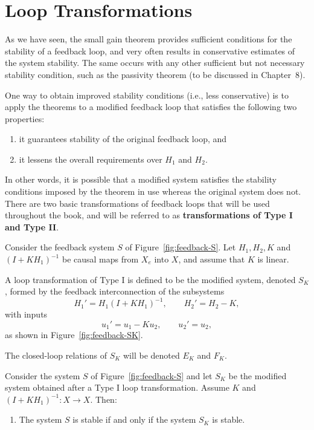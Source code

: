 \section{Loop Transformations}

As we have seen, the small gain theorem provides sufficient conditions for the stability of a feedback loop, and very often results in conservative estimates of the system stability.  
The same occurs with any other sufficient but not necessary stability condition, such as the passivity theorem (to be discussed in Chapter~8).  

One way to obtain improved stability conditions (i.e., less conservative) is to apply the theorems to a modified feedback loop that satisfies the following two properties:  

\begin{enumerate}
\item  it guarantees stability of the original feedback loop, and  
\item  it lessens the overall requirements over $H_1$ and $H_2$. 
\end{enumerate}

In other words, it is possible that a modified system satisfies the stability conditions imposed by the theorem in use whereas the original system does not.  
There are two basic transformations of feedback loops that will be used throughout the book, and will be referred to as \textbf{transformations of Type I and Type II}.  


\begin{definition}
Consider the feedback system $S$ of Figure~\ref{fig:feedback-S}.  
Let $H_1, H_2, K$ and $(I+KH_1)^{-1}$ be causal maps from $X_e$ into $X$, and assume that $K$ is linear.  

A loop transformation of Type I is defined to be the modified system, denoted $S_K$, formed by the feedback interconnection of the subsystems
\[
H_1' = H_1 (I+KH_1)^{-1}, \qquad H_2' = H_2 - K,
\]
with inputs
\[
u_1' = u_1 - Ku_2, \qquad u_2' = u_2,
\]
as shown in Figure~\ref{fig:feedback-SK}.  

The closed-loop relations of $S_K$ will be denoted $E_K$ and $F_K$.
\end{definition}

\begin{theorem}
Consider the system $S$ of Figure~\ref{fig:feedback-S} and let $S_K$ be the modified system obtained after a Type I loop transformation. Assume $K$ and $(I+KH_1)^{-1}: X \to X$. Then:
\begin{enumerate}
    \item The system $S$ is stable if and only if the system $S_K$ is stable.
\end{enumerate}
\end{theorem}


